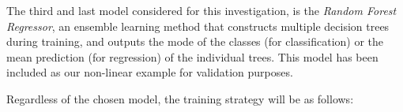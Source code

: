 \documentclass[12pt]{report} %
\begin{document}


The third and last model considered for this investigation, is the \textit{Random Forest Regressor}, an ensemble learning method that constructs multiple decision trees during training, and outputs the mode of the classes (for classification) or the mean prediction (for regression) of the individual trees. This model has been included as our non-linear example for validation purposes.




Regardless of the chosen model, the training strategy will be as follows:
\end{document}
